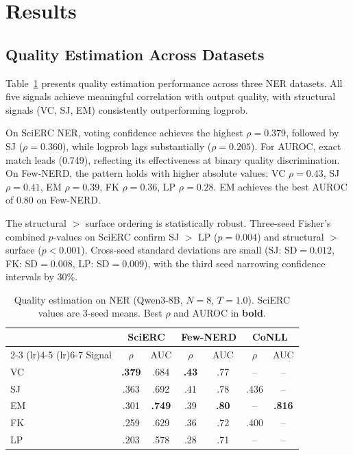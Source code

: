 \documentclass[11pt,twocolumn]{article}
\begin{document}
\section{Results}
\label{sec:results}

\subsection{Quality Estimation Across Datasets}
\label{sec:qe}

Table~\ref{tab:qe_comparison} presents quality estimation performance across three NER datasets.
All five signals achieve meaningful correlation with output quality, with structural signals (VC, SJ, EM) consistently outperforming logprob.

On SciERC NER, voting confidence achieves the highest $\rho{=}0.379$, followed by SJ ($\rho{=}0.360$), while logprob lags substantially ($\rho{=}0.205$).
For AUROC, exact match leads (0.749), reflecting its effectiveness at binary quality discrimination.
On Few-NERD, the pattern holds with higher absolute values: VC $\rho{=}0.43$, SJ $\rho{=}0.41$, EM $\rho{=}0.39$, FK $\rho{=}0.36$, LP $\rho{=}0.28$.
EM achieves the best AUROC of 0.80 on Few-NERD.

The structural $>$ surface ordering is statistically robust.
Three-seed Fisher's combined $p$-values on SciERC confirm SJ $>$ LP ($p{=}0.004$) and structural $>$ surface ($p{<}0.001$).
Cross-seed standard deviations are small (SJ: SD${=}0.012$, FK: SD${=}0.008$, LP: SD${=}0.009$), with the third seed narrowing confidence intervals by 30\%.

\begin{table}[t]
\centering
\small
\caption{Quality estimation on NER (Qwen3-8B, $N{=}8$, $T{=}1.0$). SciERC values are 3-seed means. Best $\rho$ and AUROC in \textbf{bold}.}
\label{tab:qe_comparison}
\begin{tabular}{@{}l cc cc cc@{}}
\toprule
& \multicolumn{2}{c}{SciERC} & \multicolumn{2}{c}{Few-NERD} & \multicolumn{2}{c}{CoNLL} \\
\cmidrule(lr){2-3} \cmidrule(lr){4-5} \cmidrule(lr){6-7}
Signal & $\rho$ & AUC & $\rho$ & AUC & $\rho$ & AUC \\
\midrule
VC    & \textbf{.379} & .684 & \textbf{.43} & .77 & -- & -- \\
SJ    & .363 & .692 & .41 & .78 & .436 & -- \\
EM    & .301 & \textbf{.749} & .39 & \textbf{.80} & -- & \textbf{.816} \\
FK    & .259 & .629 & .36 & .72 & .400 & -- \\
LP    & .203 & .578 & .28 & .71 & -- & -- \\
\bottomrule
\end{tabular}
\end{table}
\end{document}
